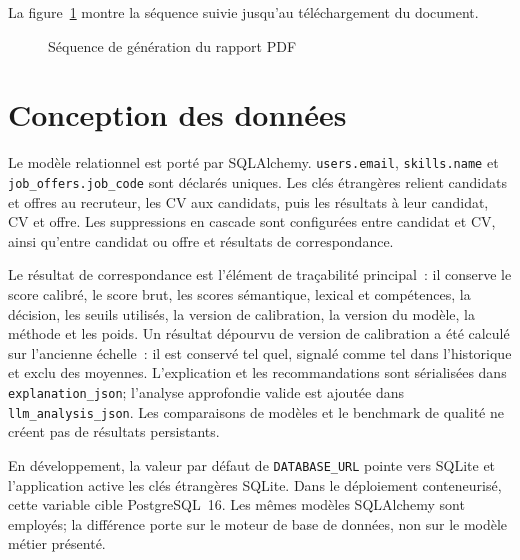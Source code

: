La figure~\ref{fig:seq-pdf} montre la séquence suivie jusqu'au téléchargement du document.

\begin{figure}[H]
\centering

\caption{Séquence de génération du rapport PDF}
\label{fig:seq-pdf}
\end{figure}

\section{Conception des données}
Le modèle relationnel est porté par SQLAlchemy. \texttt{users.email}, \texttt{skills.name} et \texttt{job\_offers.job\_code} sont déclarés uniques. Les clés étrangères relient candidats et offres au recruteur, les CV aux candidats, puis les résultats à leur candidat, CV et offre. Les suppressions en cascade sont configurées entre candidat et CV, ainsi qu'entre candidat ou offre et résultats de correspondance.

Le résultat de correspondance est l'élément de traçabilité principal~: il conserve le score calibré, le score brut, les scores sémantique, lexical et compétences, la décision, les seuils utilisés, la version de calibration, la version du modèle, la méthode et les poids. Un résultat dépourvu de version de calibration a été calculé sur l'ancienne échelle~: il est conservé tel quel, signalé comme tel dans l'historique et exclu des moyennes. L'explication et les recommandations sont sérialisées dans \texttt{explanation\_json}; l'analyse approfondie valide est ajoutée dans \texttt{llm\_analysis\_json}. Les comparaisons de modèles et le benchmark de qualité ne créent pas de résultats persistants.

En développement, la valeur par défaut de \texttt{DATABASE\_URL} pointe vers SQLite et l'application active les clés étrangères SQLite. Dans le déploiement conteneurisé, cette variable cible PostgreSQL~16. Les mêmes modèles SQLAlchemy sont employés; la différence porte sur le moteur de base de données, non sur le modèle métier présenté.

